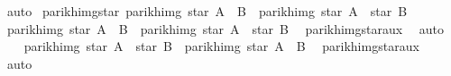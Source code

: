 \begin{isabellebody}
\ auto\isanewline
{}\isamarkupfalse%
%
\endisatagproof
{\isafoldproof}%
%
\isadelimproof
\isanewline
%
\endisadelimproof
\isanewline
\isanewline
{}\isamarkupfalse%
\ parikh{\isacharunderscore}{\kern0pt}img{\isacharunderscore}{\kern0pt}star{\isacharcolon}{\kern0pt}\ {\isachardoublequoteopen}parikh{\isacharunderscore}{\kern0pt}img\ {\isacharparenleft}{\kern0pt}star\ {\isacharparenleft}{\kern0pt}A\ {\isasymunion}\ B{\isacharparenright}{\kern0pt}{\isacharparenright}{\kern0pt}\ {\isacharequal}{\kern0pt}\ parikh{\isacharunderscore}{\kern0pt}img\ {\isacharparenleft}{\kern0pt}star\ A\ {\isacharat}{\kern0pt}{\isacharat}{\kern0pt}\ star\ B{\isacharparenright}{\kern0pt}{\isachardoublequoteclose}\isanewline
%
\isadelimproof
%
\endisadelimproof
%
\isatagproof
{}\isamarkupfalse%
\isanewline
\ \ \isamarkupfalse%
\ {\isachardoublequoteopen}parikh{\isacharunderscore}{\kern0pt}img\ {\isacharparenleft}{\kern0pt}star\ {\isacharparenleft}{\kern0pt}A\ {\isasymunion}\ B{\isacharparenright}{\kern0pt}{\isacharparenright}{\kern0pt}\ {\isasymsubseteq}\ parikh{\isacharunderscore}{\kern0pt}img\ {\isacharparenleft}{\kern0pt}star\ A\ {\isacharat}{\kern0pt}{\isacharat}{\kern0pt}\ star\ B{\isacharparenright}{\kern0pt}{\isachardoublequoteclose}\ \isamarkupfalse%
\ parikh{\isacharunderscore}{\kern0pt}img{\isacharunderscore}{\kern0pt}star{\isacharunderscore}{\kern0pt}aux{}\ \isamarkupfalse%
\ auto\isanewline
\ \ \isamarkupfalse%
\ {\isachardoublequoteopen}parikh{\isacharunderscore}{\kern0pt}img\ {\isacharparenleft}{\kern0pt}star\ A\ {\isacharat}{\kern0pt}{\isacharat}{\kern0pt}\ star\ B{\isacharparenright}{\kern0pt}\ {\isasymsubseteq}\ parikh{\isacharunderscore}{\kern0pt}img\ {\isacharparenleft}{\kern0pt}star\ {\isacharparenleft}{\kern0pt}A\ {\isasymunion}\ B{\isacharparenright}{\kern0pt}{\isacharparenright}{\kern0pt}{\isachardoublequoteclose}\ \isamarkupfalse%
\ parikh{\isacharunderscore}{\kern0pt}img{\isacharunderscore}{\kern0pt}star{\isacharunderscore}{\kern0pt}aux{}\ \isamarkupfalse%
\ auto\isanewline
{}\isamarkupfalse%
%
\endisatagproof
{\isafoldproof}%
%
\isadelimproof
%
\endisadelimproof
%
\isadelimdocument
%
\endisadelimdocument
%
\isatagdocument
%
\isamarkuptrue%
%
\endisatagdocument
{\isafolddocument}%
%
\isadelimdocument
%
\endisadelimdocument
{}\isamarkupfalse%

\end{isabellebody}
